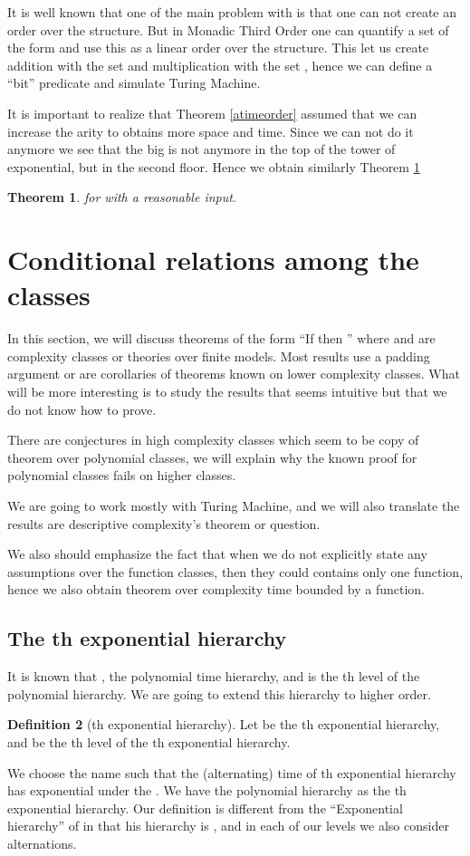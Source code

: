 \documentclass[a4paper,12pt]{article}
\newtheorem{theorem}{Theorem}[section]
\theoremstyle{definition}
\newtheorem{definition}[theorem]{Definition}
\begin{document}
It is well known that one of the main problem with  is that one
can not create an order over the structure. But in Monadic Third Order
one can quantify a set of the form  and use this
as a linear order over the structure. This let us create addition with
the set  and multiplication with the set
, hence we can define a ``bit'' predicate
and simulate Turing Machine. 

It is important to realize that Theorem \ref{atimeorder} assumed that
we can increase the arity to obtains more space and time. Since we can
not do it anymore we see that the big  is not anymore in the top of
the tower of exponential, but in the second floor. Hence we
obtain similarly  Theorem  \ref{mho_t}

\begin{theorem}\label{mho_t}
   for  with a
  reasonable input.
\end{theorem}









\section{Conditional relations among the classes}\label{cond}
In this section, we will discuss theorems of the form ``If 
then '' where  and  are complexity classes or
theories over finite models.  Most results use a padding argument
or are corollaries of theorems known on lower complexity classes. What
will be more interesting is to study the results that seems intuitive
but that we do not know how to prove.

There are conjectures in high complexity classes which seem to be copy
of theorem over polynomial classes, we will explain why the known
proof for polynomial classes fails on higher classes.

We are going to work mostly with Turing Machine, and we will also
translate the results are descriptive complexity's theorem or
question.

We also should emphasize the fact that when we do not explicitly state
any assumptions over the function classes, then they could contains
only one function, hence we also obtain theorem over complexity time
bounded by a function.

\subsection{The th exponential hierarchy}
It is known that , the polynomial time hierarchy, and
 is the th level of the
polynomial hierarchy. We are going to extend this hierarchy to higher
order.
\begin{definition}[th exponential hierarchy]
  Let  be the th exponential hierarchy, and
   be the th level of the th exponential
  hierarchy.
\end{definition}
We choose the name such that the (alternating) time of th
exponential hierarchy has  exponential under the .  We have the
polynomial hierarchy as the th exponential
hierarchy. Our definition is different from the ``Exponential
hierarchy'' of \cite{pap} in that his hierarchy is
, and in each of
our levels we also consider alternations.
\end{document}
